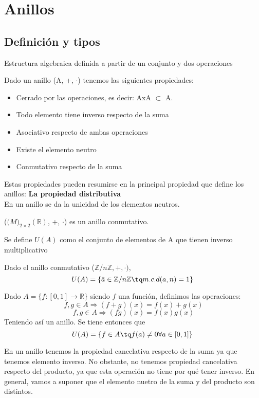 \documentclass[nochap]{apuntes}
\begin{document}
\section{Anillos}
\subsection{Definición y tipos}
\begin{defn}[Anillo]
 Estructura algebraica definida a partir de un conjunto y dos operaciones
\end{defn}
Dado un anillo (A, +, $\cdot$) tenemos las siguientes propiedades:
\begin{itemize}
 \item Cerrado por las operaciones, es decir: AxA $\subset$ A.
 \item Todo elemento tiene inverso respecto de la suma
 \item Asociativo respecto de ambas operaciones
 \item Existe el elemento neutro
 \item Conmutativo respecto de la suma
\end{itemize}
Estas propiedades pueden resumirse en la principal propiedad que define los anillos: \textbf{La propiedad distributiva}\\
En un anillo se da la unicidad de los elementos neutros.
\begin{example}
 ($\mathbb(M)_{2\times 2}(\mathbb{R})$, +, $\cdot$) es un anillo conmutativo.
\end{example}

\begin{defn}[Unidades]
 Se define $U(A)$ como  el conjunto de elementos de A que tienen inverso multiplicativo
\end{defn}

\begin{example}
 Dado el anillo conmutativo ($\mathbb{Z}/n\mathbb{Z},+,\cdot)$, \[ U(A)=\{\bar{a}\in\mathbb{Z}/n\mathbb{Z} \tq m.c.d(a,n)=1\} \]
\end{example}

\begin{example}
 Dado $A=\{f:[0,1] \rightarrow \mathbb{R}\}$  siendo $f$ una función, definimos las operaciones:
 \[f, g \in A \Rightarrow (f+g)(x)=f(x)+g(x)\]
 \[f, g \in A \Rightarrow (fg)(x)=f(x)g(x)\]
 Teniendo así un anillo. Se tiene entonces que \[ U(A)=\{f\in A \tq f(a) \neq 0 \forall a \in [0,1]\} \]
\end{example}

En un anillo tenemos la propiedad cancelativa respecto de la suma ya que tenemos elemento inverso. No obstante, no tenemos propiedad cancelativa respecto del producto, ya que esta operación no tiene por qué tener inverso. En general, vamos a suponer que el elemento nuetro de la suma y del producto son distintos.
\end{document}
